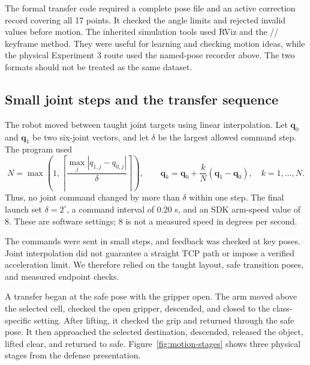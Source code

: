 The formal transfer code required a complete pose file and an active correction record covering all 17 points. It checked the angle limits and rejected invalid values before motion. The inherited simulation tools used RViz and the // keyframe method. They were useful for learning and checking motion ideas, while the physical Experiment 3 route used the named-pose recorder above. The two formats should not be treated as the same dataset.

\subsection{Small joint steps and the transfer sequence}

The robot moved between taught joint targets using linear interpolation. Let $\mathbf q_0$ and $\mathbf q_1$ be two six-joint vectors, and let $\delta$ be the largest allowed command step. The program used
\begin{equation}
N=\max\!\left(1,\left\lceil\frac{\max_j|q_{1,j}-q_{0,j}|}{\delta}\right\rceil\right),
\qquad
\mathbf q_k=\mathbf q_0+\frac{k}{N}(\mathbf q_1-\mathbf q_0),\quad k=1,\ldots,N.
\end{equation}
Thus, no joint command changed by more than $\delta$ within one step. The final launch set $\delta=2^{\circ}$, a command interval of 0.20 s, and an SDK arm-speed value of 8. These are software settings; 8 is not a measured speed in degrees per second.

The commands were sent in small steps, and feedback was checked at key poses. Joint interpolation did not guarantee a straight TCP path or impose a verified acceleration limit. We therefore relied on the taught layout, safe transition poses, and measured endpoint checks.

A transfer began at the safe pose with the gripper open. The arm moved above the selected cell, checked the open gripper, descended, and closed to the class-specific setting. After lifting, it checked the grip and returned through the safe pose. It then approached the selected destination, descended, released the object, lifted clear, and returned to safe. Figure~\ref{fig:motion-stages} shows three physical stages from the defense presentation.

